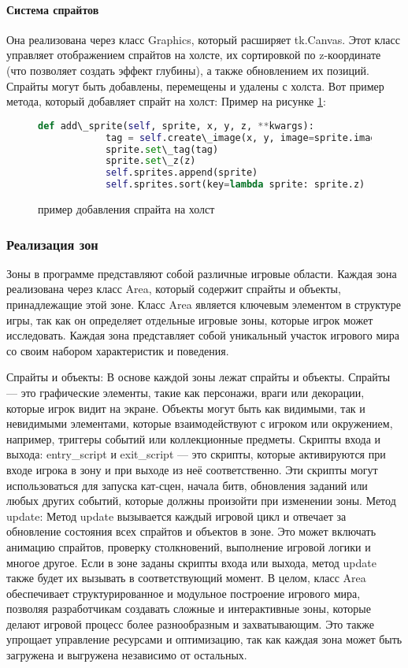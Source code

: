\paragraph{Система спрайтов}
Она реализована через класс Graphics, который расширяет tk.Canvas. Этот класс управляет отображением спрайтов на холсте, их сортировкой по z-координате (что позволяет создать эффект глубины), а также обновлением их позиций. Спрайты могут быть добавлены, перемещены и удалены с холста. Вот пример метода, который добавляет спрайт на холст:
Пример на рисунке \ref{ttk:image}:
\begin{figure}[H]
	\begin{lstlisting}[language=Python]
		def add\_sprite(self, sprite, x, y, z, **kwargs):
			tag = self.create\_image(x, y, image=sprite.image, anchor='center', **kwargs)
			sprite.set\_tag(tag)
			sprite.set\_z(z)
			self.sprites.append(sprite)
			self.sprites.sort(key=lambda sprite: sprite.z)
\end{lstlisting}  
\caption{пример добавления спрайта на холст}
\label{ttk:image}
\end{figure}
\subsubsection{Реализация зон}
Зоны в программе представляют собой различные игровые области. Каждая зона реализована через класс Area, который содержит спрайты и объекты, принадлежащие этой зоне. Класс Area является ключевым элементом в структуре игры, так как он определяет отдельные игровые зоны, которые игрок может исследовать. Каждая зона представляет собой уникальный участок игрового мира со своим набором характеристик и поведения.

Спрайты и объекты: В основе каждой зоны лежат спрайты и объекты. Спрайты — это графические элементы, такие как персонажи, враги или декорации, которые игрок видит на экране. Объекты могут быть как видимыми, так и невидимыми элементами, которые взаимодействуют с игроком или окружением, например, триггеры событий или коллекционные предметы.
Скрипты входа и выхода: entry\_script и exit\_script — это скрипты, которые активируются при входе игрока в зону и при выходе из неё соответственно. Эти скрипты могут использоваться для запуска кат-сцен, начала битв, обновления заданий или любых других событий, которые должны произойти при изменении зоны.
Метод update: Метод update вызывается каждый игровой цикл и отвечает за обновление состояния всех спрайтов и объектов в зоне. Это может включать анимацию спрайтов, проверку столкновений, выполнение игровой логики и многое другое. Если в зоне заданы скрипты входа или выхода, метод update также будет их вызывать в соответствующий момент.
В целом, класс Area обеспечивает структурированное и модульное построение игрового мира, позволяя разработчикам создавать сложные и интерактивные зоны, которые делают игровой процесс более разнообразным и захватывающим. Это также упрощает управление ресурсами и оптимизацию, так как каждая зона может быть загружена и выгружена независимо от остальных.
